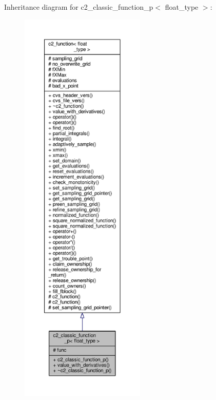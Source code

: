 Inheritance diagram for c2\+\_\+classic\+\_\+function\+\_\+p$<$ float\+\_\+type $>$\+:
\nopagebreak
\begin{figure}[H]
\begin{center}
\leavevmode
\includegraphics[height=550pt]{classc2__classic__function__p__inherit__graph}
\end{center}
\end{figure}



